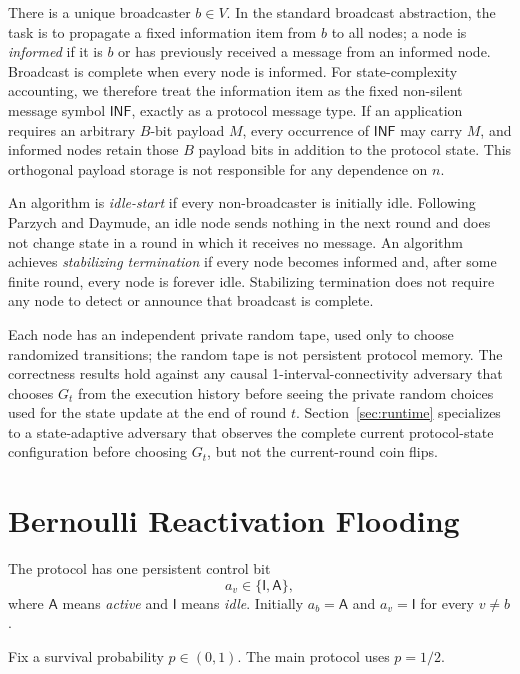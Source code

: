 \documentclass[11pt]{article}
\newcommand{\A}{\mathsf{A}}
\newcommand{\I}{\mathsf{I}}
\begin{document}
There is a unique broadcaster $b\in V$. In the standard broadcast abstraction, the task is to propagate a fixed information item from $b$ to all nodes; a node is \emph{informed} if it is $b$ or has previously received a message from an informed node. Broadcast is complete when every node is informed. For state-complexity accounting, we therefore treat the information item as the fixed non-silent message symbol $\mathsf{INF}$, exactly as a protocol message type. If an application requires an arbitrary $B$-bit payload $M$, every occurrence of $\mathsf{INF}$ may carry $M$, and informed nodes retain those $B$ payload bits in addition to the protocol state. This orthogonal payload storage is not responsible for any dependence on $n$.

An algorithm is \emph{idle-start} if every non-broadcaster is initially idle. Following Parzych and Daymude, an idle node sends nothing in the next round and does not change state in a round in which it receives no message. An algorithm achieves \emph{stabilizing termination} if every node becomes informed and, after some finite round, every node is forever idle. Stabilizing termination does not require any node to detect or announce that broadcast is complete.

Each node has an independent private random tape, used only to choose randomized transitions; the random tape is not persistent protocol memory. The correctness results hold against any causal 1-interval-connectivity adversary that chooses $G_t$ from the execution history before seeing the private random choices used for the state update at the end of round $t$. Section~\ref{sec:runtime} specializes to a state-adaptive adversary that observes the complete current protocol-state configuration before choosing $G_t$, but not the current-round coin flips.

\section{Bernoulli Reactivation Flooding}

The protocol has one persistent control bit
\[
  a_v\in\{\I,\A\},
\]
where $\A$ means \emph{active} and $\I$ means \emph{idle}. Initially $a_b=\A$ and $a_v=\I$ for every $v\neq b$.

Fix a survival probability $p\in(0,1)$. The main protocol uses $p=1/2$.
\end{document}
